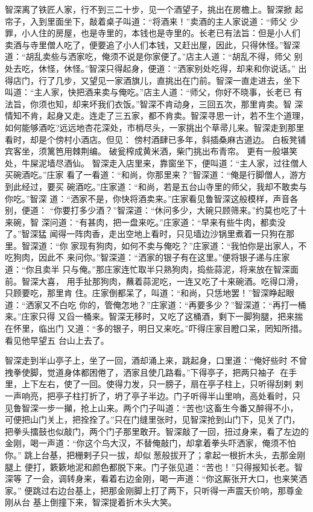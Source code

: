 智深离了铁匠人家，行不到三二十步，见一个酒望子，挑出在房檐上。智深掀
起帘子，入到里面坐下，敲着桌子叫道：“将酒来！”卖酒的主人家说道：“师父
少罪，小人住的房屋，也是寺里的，本钱也是寺里的。长老已有法旨：但是小人们
卖酒与寺里僧人吃了，便要追了小人们本钱，又赶出屋，因此，只得休怪。”智深
道：“胡乱卖些与洒家吃，俺须不说是你家便了。”店主人道：“胡乱不得，师父
别处去吃，休怪，休怪。”智深只得起身，便道：“洒家别处吃得，却来和你说话。”
出得店门，行了几步，又望见一家酒旗儿，直挑出在门前。智深一直走进去，坐下
叫道：“主人家，快把酒来卖与俺吃。”店主人道：“师父，你好不晓事，长老已
有法旨，你须也知，却来坏我们衣饭。”智深不肯动身，三回五次，那里肯卖。智
深情知不肯，起身又走。连走了三五家，都不肯卖。智深寻思一计，若不生个道理，
如何能够酒吃?远远地杏花深处，市梢尽头，一家挑出个草帚儿来。智深走到那里
看时，却是个傍村小酒店。但见：
傍村酒肆已多年，斜插桑麻古道边。
白板凳铺宾客坐，须篱笆用棘荆编。
破瓮榨成黄米酒，柴门挑出布青帘。
更有一般堪笑处，牛屎泥墙尽酒仙。
智深走入店里来，靠窗坐下，便叫道：“主人家，过往僧人买碗酒吃。”庄家
看了一看道：“和尚，你那里来？”智深道：“俺是行脚僧人，游方到此经过，要买
碗酒吃。”庄家道：“和尚，若是五台山寺里的师父，我却不敢卖与你吃。”智深
道：“洒家不是，你快将酒卖来。”庄家看见鲁智深这般模样，声音各别，便道：
“你要打多少酒？”智深道：“休问多少，大碗只顾筛来。”约莫也吃了十来碗，智
深问道：“有甚肉，把一盘来吃。”庄家道：“早来有些牛肉，都卖没了。”智深猛
闻得一阵肉香，走出空地上看时，只见墙边沙锅里煮着一只狗在那里。智深道：“你
家现有狗肉，如何不卖与俺吃？”庄家道：“我怕你是出家人，不吃狗肉，因此不
来问你。”智深道：“洒家的银子有在这里。”便将银子递与庄家道：“你且卖半
只与俺。”那庄家连忙取半只熟狗肉，捣些蒜泥，将来放在智深面前。智深大喜，
用手扯那狗肉，蘸着蒜泥吃，一连又吃了十来碗酒。吃得口滑，只顾要吃，那里肯
住。庄家倒都呆了，叫道：“和尚，只恁地罢！”智深睁起眼道：“洒家又不白吃
你的，管俺怎地？”庄家道：“再要多少？”智深道：“再打一桶来。”庄家只得
又舀一桶来。智深无移时，又吃了这桶酒，剩下一脚狗腿，把来揣在怀里，临出门
又道：“多的银子，明日又来吃。”吓得庄家目瞪口呆，罔知所措。看见他早望五
台山上去了。

智深走到半山亭子上，坐了一回，酒却涌上来，跳起身，口里道：“俺好些时
不曾拽拳使脚，觉道身体都困倦了，洒家且使几路看。”下得亭子，把两只袖子
在手里，上下左右，使了一回。使得力发，只一膀子，扇在亭子柱上，只听得刮剌
剌一声响亮，把亭子柱打折了，坍了亭子半边。门子听得半山里响，高处看时，只
见鲁智深一步一攧，抢上山来。两个门子叫道：“苦也!这畜生今番又醉得不小，
可便把山门关上，把拴拴了。”只在门缝里张时，见智深抢到山门下，见关了门，
把拳头擂鼓也似敲门，两个门子那里敢开。智深敲了一回，扭过身来，看了左边的
金刚，喝一声道：“你这个鸟大汉，不替俺敲门，却拿着拳头吓洒家，俺须不怕你。”
跳上台基，把栅剌子只一拔，却似葱般拔开了；拿起一根折木头，去那金刚腿上
便打，簌簌地泥和颜色都脱下来。门子张见道：“苦也！”只得报知长老。智深等
了一会，调转身来，看着右边金刚，喝一声道：“你这厮张开大口，也来笑洒家。”
便跳过右边台基上，把那金刚脚上打了两下，只听得一声震天价响，那尊金刚从台
基上倒撞下来，智深提着折木头大笑。

